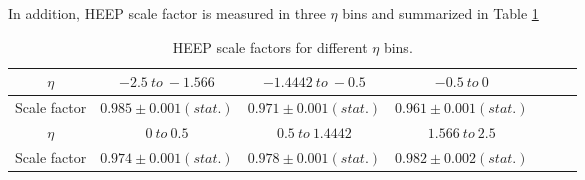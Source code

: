 In addition, HEEP scale factor is measured in three $\eta$ bins and summarized in Table \ref{tab:eff_eta_bins_2016}
\begin{table}[!htbp]
  \caption{\label{tab:eff_eta_bins_2016}
  HEEP scale factors for different $\eta$ bins.}
  \begin{center}
    \tabcolsep=15pt
    \begin{tabular}{ccccccc}
      \hline
      $\eta$        & $-2.5~to~-1.566$         & $-1.4442~to~-0.5$       & $-0.5~to~0$            \\
      \hline
      Scale factor  & $0.985 \pm 0.001(stat.)$ & $0.971\pm 0.001(stat.)$ & $0.961\pm 0.001(stat.)$ \\
      \hline
      \hline
      $\eta$        & $0~to~0.5$                & $0.5~to~1.4442$         & $1.566~to~2.5$ \\
      \hline
      Scale factor  & $0.974\pm 0.001(stat.)$ & $0.978\pm 0.001(stat.)$ & $0.982\pm 0.002(stat.)$ \\
      \hline
    \end{tabular}
  \end{center}
\end{table}


